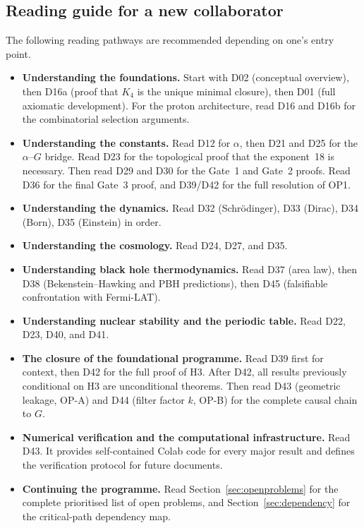 \documentclass[11pt,a4paper]{article}
\theoremstyle{plain}
\theoremstyle{definition}
\theoremstyle{remark}
\begin{document}
\subsection{Reading guide for a new collaborator}
\label{subsec:readingguide}
The following reading pathways are recommended depending on one's entry point.

\begin{itemize}
\item \textbf{Understanding the foundations.} Start with D02 (conceptual overview), then D16a (proof that $K_4$ is the unique minimal closure), then D01 (full axiomatic development). For the proton architecture, read D16 and D16b for the combinatorial selection arguments.
\item \textbf{Understanding the constants.} Read D12 for $\alpha$, then D21 and D25 for the $\alpha$--$G$ bridge. Read D23 for the topological proof that the exponent~18 is necessary. Then read D29 and D30 for the Gate~1 and Gate~2 proofs. Read D36 for the final Gate~3 proof, and D39/D42 for the full resolution of OP1.
\item \textbf{Understanding the dynamics.} Read D32 (Schr\"odinger), D33 (Dirac), D34 (Born), D35 (Einstein) in order.
\item \textbf{Understanding the cosmology.} Read D24, D27, and D35.
\item \textbf{Understanding black hole thermodynamics.} Read D37 (area law), then D38 (Bekenstein--Hawking and PBH predictions), then D45 (falsifiable confrontation with Fermi-LAT).
\item \textbf{Understanding nuclear stability and the periodic table.} Read D22, D23, D40, and D41.
\item \textbf{The closure of the foundational programme.} Read D39 first for context, then D42 for the full proof of H3. After D42, all results previously conditional on H3 are unconditional theorems. Then read D43 (geometric leakage, OP-A) and D44 (filter factor $k$, OP-B) for the complete causal chain to $G$.
\item \textbf{Numerical verification and the computational infrastructure.} Read D43. It provides self-contained Colab code for every major result and defines the verification protocol for future documents.
\item \textbf{Continuing the programme.} Read Section~\ref{sec:openproblems} for the complete prioritised list of open problems, and Section~\ref{sec:dependency} for the critical-path dependency map.
\end{itemize}
\end{document}
